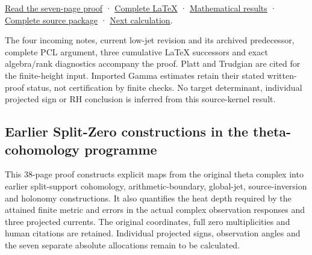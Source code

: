 \documentclass[
]{article}
\begin{document}
\href{https://github.com/KokunoYumeto/zeta-function-research-reader/blob/main/workbenches/splitzero-tandem/continuations/20260919-native-conductor-coprimality/ORIGINAL_CONDUCTOR_COPRIMALITY.pdf}{Read
the seven-page proof} ·
\href{https://github.com/KokunoYumeto/zeta-function-research-reader/blob/main/workbenches/splitzero-tandem/continuations/20260919-native-conductor-coprimality/ORIGINAL_CONDUCTOR_COPRIMALITY.tex}{Complete
LaTeX} ·
\href{https://github.com/KokunoYumeto/zeta-function-research-reader/blob/main/workbenches/splitzero-tandem/continuations/20260919-native-conductor-coprimality/NEW_RESULTS_2026-09-19.md}{Mathematical
results} ·
\href{https://github.com/KokunoYumeto/zeta-function-research-reader/blob/main/workbenches/splitzero-tandem/continuations/20260919-native-conductor-coprimality/README.md}{Complete
source package} ·
\href{https://github.com/KokunoYumeto/zeta-function-research-reader/blob/main/workbenches/splitzero-tandem/continuations/20260919-native-conductor-coprimality/CONTINUATION.md}{Next
calculation}.

The four incoming notes, current low-jet revision and its archived
predecessor, complete PCL argument, three cumulative LaTeX successors
and exact algebra/rank diagnostics accompany the proof. Platt and
Trudgian are cited for the finite-height input. Imported Gamma estimates
retain their stated written-proof status, not certification by finite
checks. No target determinant, individual projected sign or RH
conclusion is inferred from this source-kernel result.

\subsection{Earlier Split-Zero constructions in the theta-cohomology
programme}\label{earlier-split-zero-constructions-in-the-theta-cohomology-programme}

This 38-page proof constructs explicit maps from the original theta
complex into earlier split-support cohomology, arithmetic-boundary,
global-jet, source-inversion and holonomy constructions. It also
quantifies the heat depth required by the attained finite metric and
errors in the actual complex observation responses and three projected
currents. The original coordinates, full zero multiplicities and human
citations are retained. Individual projected signs, observation angles
and the seven separate absolute allocations remain to be calculated.
\end{document}
